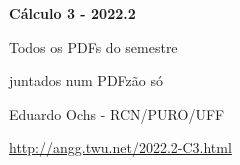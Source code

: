 \documentclass[oneside,12pt]{article}
\begin{document}

\def\u#1{\par{\footnotesize \url{#1}}}

\def\drafturl{http://angg.twu.net/LATEX/2022-2-C3.pdf}
\def\drafturl{http://angg.twu.net/2022.2-C3.html}
\def\draftfooter{\tiny \href{\drafturl}{\jobname{}} \ColorBrown{\shorttoday{} \hours}}



%

\thispagestyle{empty}

\begin{center}

\vspace*{1.2cm}

{\bf \Large Cálculo 3 - 2022.2}

\bsk

Todos os PDFs do semestre

juntados num PDFzão só

\bsk

Eduardo Ochs - RCN/PURO/UFF

\url{http://angg.twu.net/2022.2-C3.html}

\end{center}

\newpage

\def\incl#1{}

\incl{2022-2-C3-intro}

\end{document}
